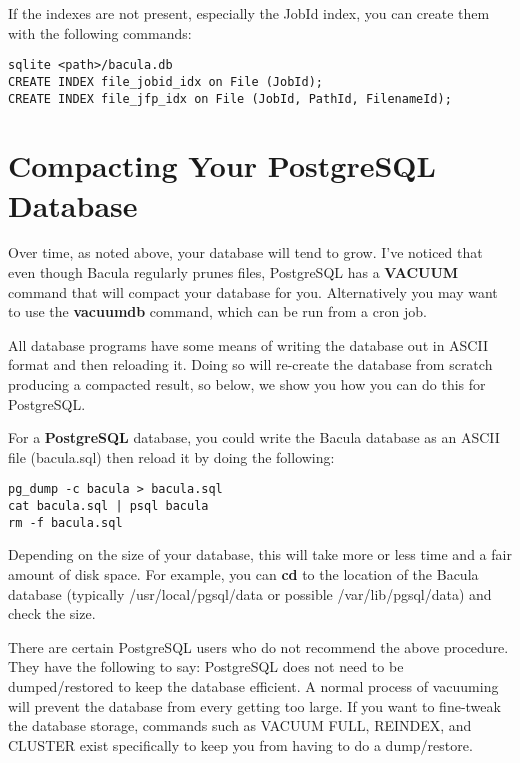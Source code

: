 If the indexes are not present, especially the JobId index, you can
create them with the following commands:

\footnotesize
\begin{verbatim}
sqlite <path>/bacula.db
CREATE INDEX file_jobid_idx on File (JobId);
CREATE INDEX file_jfp_idx on File (JobId, PathId, FilenameId);
\end{verbatim}
\normalsize



\label{CompactingPostgres}
\section{Compacting Your PostgreSQL Database}

Over time, as noted above, your database will tend to grow. I've noticed that
even though Bacula regularly prunes files, PostgreSQL has a {\bf VACUUM}
command that will compact your database for you. Alternatively you may want to
use the {\bf vacuumdb} command, which can be run from a cron job. 

All database programs have some means of writing the database out in ASCII
format and then reloading it. Doing so will re-create the database from
scratch producing a compacted result, so below, we show you how you can do
this for PostgreSQL. 

For a {\bf PostgreSQL} database, you could write the Bacula database as an
ASCII file (bacula.sql) then reload it by doing the following: 

\footnotesize
\begin{verbatim}
pg_dump -c bacula > bacula.sql
cat bacula.sql | psql bacula
rm -f bacula.sql
\end{verbatim}
\normalsize

Depending on the size of your database, this will take more or less time and a
fair amount of disk space. For example, you can {\bf cd} to the location of
the Bacula database (typically /usr/local/pgsql/data or possible
/var/lib/pgsql/data) and check the size. 

There are certain PostgreSQL users who do not recommend the above 
procedure. They have the following to say:
PostgreSQL does not
need to be dumped/restored to keep the database efficient.  A normal
process of vacuuming will prevent the database from every getting too
large.  If you want to fine-tweak the database storage, commands such
as VACUUM FULL, REINDEX, and CLUSTER exist specifically to keep you
from having to do a dump/restore.

